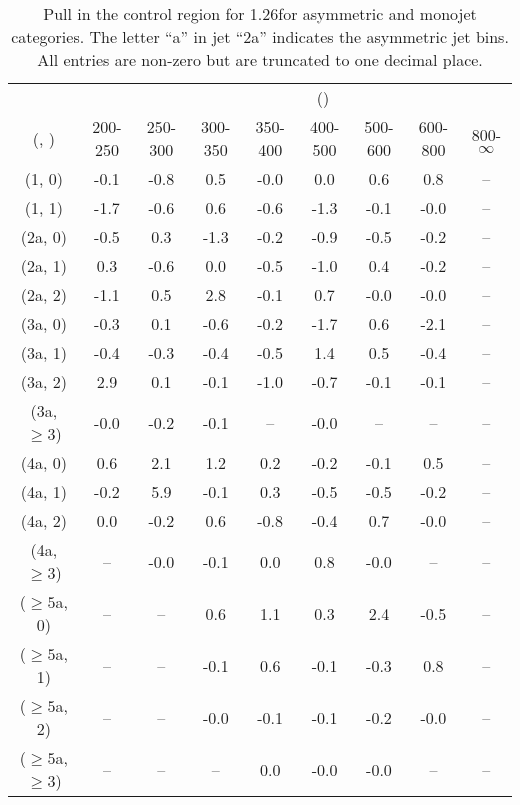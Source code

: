 \begin{table}[h!]
\tiny
\centering
\caption{Pull in the \mmj control region for 1.26\ifb for asymmetric and monojet categories. The letter ``a'' in jet \eg ``2a''  indicates the asymmetric jet bins. All entries are non-zero but are truncated to one decimal place.\label{tab:pullsep_mumu_ewk_asym}}
\begin{tabular}
{ccccccccc}
	\hline\hline
&	& \multicolumn{8}{c}{\scalht (\gev)} \\ 
	 (\njet,  \nb) & 200-250 & 250-300 & 300-350 & 350-400 & 400-500 & 500-600 & 600-800 & 800-$\infty$ \\ [0.8ex] 
\hline
	(1, 0) & -0.1 & -0.8 & 0.5 & -0.0 & 0.0 & 0.6 & 0.8 & -- \\[0.5ex] 
	(1, 1) & -1.7 & -0.6 & 0.6 & -0.6 & -1.3 & -0.1 & -0.0 & -- \\[0.5ex] 
	(2a, 0) & -0.5 & 0.3 & -1.3 & -0.2 & -0.9 & -0.5 & -0.2 & -- \\[0.5ex] 
	(2a, 1) & 0.3 & -0.6 & 0.0 & -0.5 & -1.0 & 0.4 & -0.2 & -- \\[0.5ex] 
	(2a, 2) & -1.1 & 0.5 & 2.8 & -0.1 & 0.7 & -0.0 & -0.0 & -- \\[0.5ex] 
	(3a, 0) & -0.3 & 0.1 & -0.6 & -0.2 & -1.7 & 0.6 & -2.1 & -- \\[0.5ex] 
	(3a, 1) & -0.4 & -0.3 & -0.4 & -0.5 & 1.4 & 0.5 & -0.4 & -- \\[0.5ex] 
	(3a, 2) & 2.9 & 0.1 & -0.1 & -1.0 & -0.7 & -0.1 & -0.1 & -- \\[0.5ex] 
	(3a, $\ge3$) & -0.0 & -0.2 & -0.1 & -- & -0.0 & -- & -- & -- \\[0.5ex] 
	(4a, 0) & 0.6 & 2.1 & 1.2 & 0.2 & -0.2 & -0.1 & 0.5 & -- \\[0.5ex] 
	(4a, 1) & -0.2 & 5.9 & -0.1 & 0.3 & -0.5 & -0.5 & -0.2 & -- \\[0.5ex] 
	(4a, 2) & 0.0 & -0.2 & 0.6 & -0.8 & -0.4 & 0.7 & -0.0 & -- \\[0.5ex] 
	(4a, $\ge3$) & -- & -0.0 & -0.1 & 0.0 & 0.8 & -0.0 & -- & -- \\[0.5ex] 
	($\ge5$a, 0) & -- & -- & 0.6 & 1.1 & 0.3 & 2.4 & -0.5 & -- \\[0.5ex] 
	($\ge5$a, 1) & -- & -- & -0.1 & 0.6 & -0.1 & -0.3 & 0.8 & -- \\[0.5ex] 
	($\ge5$a, 2) & -- & -- & -0.0 & -0.1 & -0.1 & -0.2 & -0.0 & -- \\[0.5ex] 
	($\ge5$a, $\ge3$) & -- & -- & -- & 0.0 & -0.0 & -0.0 & -- & -- \\[0.5ex] 
	\hline
	\hline
\end{tabular}
\end{table}
